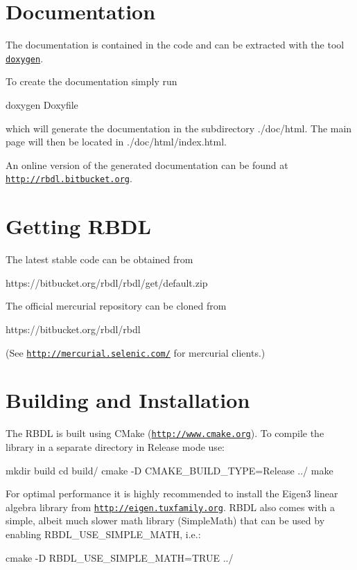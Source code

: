 \section*{Documentation }

The documentation is contained in the code and can be extracted with the tool \href{http://www.doxygen.org}{\tt doxygen}.

To create the documentation simply run \begin{DoxyVerb}doxygen Doxyfile
\end{DoxyVerb}


which will generate the documentation in the subdirectory ./doc/html. The main page will then be located in ./doc/html/index.html.

An online version of the generated documentation can be found at \href{http://rbdl.bitbucket.org}{\tt http\+://rbdl.\+bitbucket.\+org}.

\section*{Getting R\+B\+D\+L }

The latest stable code can be obtained from \begin{DoxyVerb}https://bitbucket.org/rbdl/rbdl/get/default.zip
\end{DoxyVerb}


The official mercurial repository can be cloned from \begin{DoxyVerb}https://bitbucket.org/rbdl/rbdl
\end{DoxyVerb}


(See \href{http://mercurial.selenic.com}{\tt http\+://mercurial.\+selenic.\+com/} for mercurial clients.)

\section*{Building and Installation }

The R\+B\+D\+L is built using C\+Make (\href{http://www.cmake.org}{\tt http\+://www.\+cmake.\+org}). To compile the library in a separate directory in Release mode use\+: \begin{DoxyVerb}mkdir build
cd build/
cmake -D CMAKE_BUILD_TYPE=Release ../ 
make
\end{DoxyVerb}


For optimal performance it is highly recommended to install the Eigen3 linear algebra library from \href{http://eigen.tuxfamily.org}{\tt http\+://eigen.\+tuxfamily.\+org}. R\+B\+D\+L also comes with a simple, albeit much slower math library (Simple\+Math) that can be used by enabling {\ttfamily R\+B\+D\+L\+\_\+\+U\+S\+E\+\_\+\+S\+I\+M\+P\+L\+E\+\_\+\+M\+A\+T\+H}, i.\+e.\+: \begin{DoxyVerb}cmake -D RBDL_USE_SIMPLE_MATH=TRUE ../
\end{DoxyVerb}


